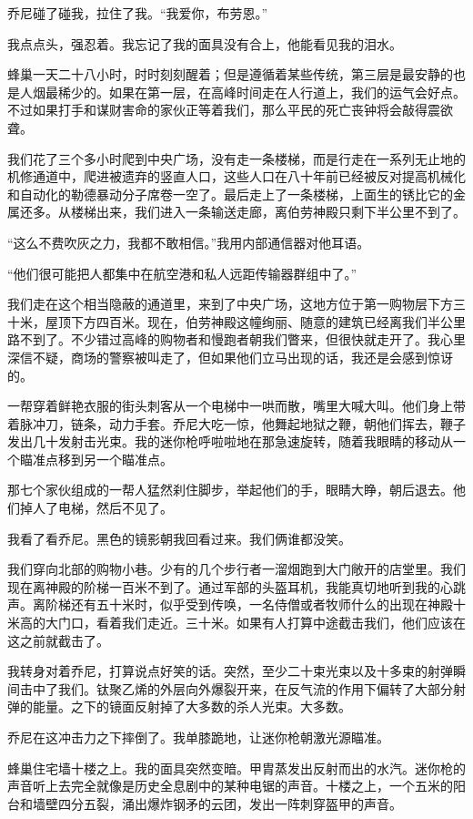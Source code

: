 \documentclass[AutoFakeBold=true]{book}
\begin{document}
乔尼碰了碰我，拉住了我。``我爱你，布劳恩。''

我点点头，强忍着。我忘记了我的面具没有合上，他能看见我的泪水。

蜂巢一天二十八小时，时时刻刻醒着；但是遵循着某些传统，第三层是最安静的也是人烟最稀少的。如果在第一层，在高峰时间走在人行道上，我们的运气会好点。不过如果打手和谋财害命的家伙正等着我们，那么平民的死亡丧钟将会敲得震欲聋。

我们花了三个多小时爬到中央广场，没有走一条楼梯，而是行走在一系列无止地的机修通道中，爬进被遗弃的竖直人口，这些人口在八十年前已经被反对提高机械化和自动化的勒德暴动分子席卷一空了。最后走上了一条楼梯，上面生的锈比它的金属还多。从楼梯出来，我们进入一条输送走廊，离伯劳神殿只剩下半公里不到了。

``这么不费吹灰之力，我都不敢相信。''我用内部通信器对他耳语。

``他们很可能把人都集中在航空港和私人远距传输器群组中了。''

我们走在这个相当隐蔽的通道里，来到了中央广场，这地方位于第一购物层下方三十米，屋顶下方四百米。现在，伯劳神殿这幢绚丽、随意的建筑已经离我们半公里路不到了。不少错过高峰的购物者和慢跑者朝我们瞥来，但很快就走开了。我心里深信不疑，商场的警察被叫走了，但如果他们立马出现的话，我还是会感到惊讶的。

一帮穿着鲜艳衣服的街头刺客从一个电梯中一哄而散，嘴里大喊大叫。他们身上带着脉冲刀，链条，动力手套。乔尼大吃一惊，他舞起地狱之鞭，朝他们挥去，鞭子发出几十发射击光束。我的迷你枪呼啦啦地在那急速旋转，随着我眼睛的移动从一个瞄准点移到另一个瞄准点。

那七个家伙组成的一帮人猛然刹住脚步，举起他们的手，眼睛大睁，朝后退去。他们掉人了电梯，然后不见了。

我看了看乔尼。黑色的镜影朝我回看过来。我们俩谁都没笑。

我们穿向北部的购物小巷。少有的几个步行者一溜烟跑到大门敞开的店堂里。我们现在离神殿的阶梯一百米不到了。通过军部的头盔耳机，我能真切地听到我的心跳声。离阶梯还有五十米时，似乎受到传唤，一名侍僧或者牧师什么的出现在神殿十米高的大门口，看着我们走近。三十米。如果有人打算中途截击我们，他们应该在这之前就截击了。

我转身对着乔尼，打算说点好笑的话。突然，至少二十束光束以及十多束的射弹瞬间击中了我们。钛聚乙烯的外层向外爆裂开来，在反气流的作用下偏转了大部分射弹的能量。之下的镜面反射掉了大多数的杀人光束。大多数。

乔尼在这冲击力之下摔倒了。我单膝跪地，让迷你枪朝激光源瞄准。

蜂巢住宅墙十楼之上。我的面具突然变暗。甲胄蒸发出反射而出的水汽。迷你枪的声音听上去完全就像是历史全息剧中的某种电锯的声音。十楼之上，一个五米的阳台和墙壁四分五裂，涌出爆炸钢矛的云团，发出一阵刺穿盔甲的声音。
\end{document}
